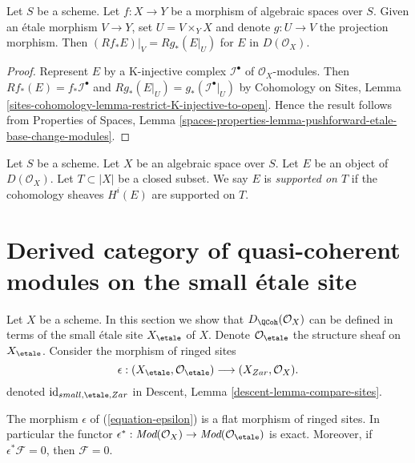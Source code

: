 \begin{lemma}
\label{lemma-restrict-direct-image-open}
Let $S$ be a scheme. Let $f : X \to Y$ be a morphism of algebraic spaces
over $S$. Given an \'etale morphism $V \to Y$, set $U = V \times_Y X$
and denote $g : U \to V$ the projection morphism. Then
$(Rf_*E)|_V = Rg_*(E|_U)$ for $E$ in $D(\mathcal{O}_X)$.
\end{lemma}

\begin{proof}
Represent $E$ by a K-injective complex $\mathcal{I}^\bullet$ of
$\mathcal{O}_X$-modules. Then $Rf_*(E) = f_*\mathcal{I}^\bullet$
and $Rg_*(E|_U) = g_*(\mathcal{I}^\bullet|_U)$ by
Cohomology on Sites, Lemma
\ref{sites-cohomology-lemma-restrict-K-injective-to-open}.
Hence the result follows from
Properties of Spaces,
Lemma \ref{spaces-properties-lemma-pushforward-etale-base-change-modules}.
\end{proof}

\begin{definition}
\label{definition-supported-on}
Let $S$ be a scheme. Let $X$ be an algebraic space over $S$.
Let $E$ be an object of $D(\mathcal{O}_X)$.
Let $T \subset |X|$ be a closed subset.
We say $E$ is {\it supported on $T$} if the
cohomology sheaves $H^i(E)$ are supported on $T$.
\end{definition}








\section{Derived category of quasi-coherent modules on the small \'etale site}
\label{section-derived-quasi-coherent-etale}

\noindent
Let $X$ be a scheme. In this section we show that
$D_\QCoh(\mathcal{O}_X)$
can be defined in terms of the small \'etale site $X_\etale$ of $X$.
Denote $\mathcal{O}_\etale$ the structure sheaf on
$X_\etale$. 
Consider the morphism of ringed sites
\begin{equation}
\label{equation-epsilon}
\epsilon :
(X_\etale, \mathcal{O}_\etale)
\longrightarrow
(X_{Zar}, \mathcal{O}_X).
\end{equation}
denoted $\text{id}_{small, \etale, Zar}$ in
Descent, Lemma \ref{descent-lemma-compare-sites}.

\begin{lemma}
\label{lemma-epsilon-flat}
The morphism $\epsilon$ of (\ref{equation-epsilon})
is a flat morphism of ringed sites. In particular the functor
$\epsilon^* : \textit{Mod}(\mathcal{O}_X) \to
\textit{Mod}(\mathcal{O}_\etale)$ is exact.
Moreover, if $\epsilon^*\mathcal{F} = 0$, then $\mathcal{F} = 0$.
\end{lemma}

